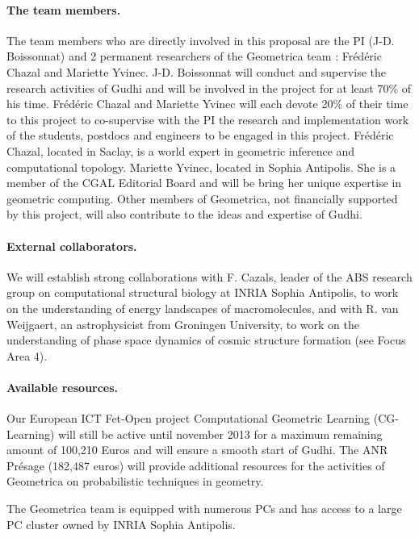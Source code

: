 \paragraph{The team members.}
The team members who are directly involved in this proposal are the PI (J-D. Boissonnat) and 2 permanent researchers of the Geometrica team : Fr\'ed\'eric Chazal and Mariette Yvinec.  J-D. Boissonnat will conduct and supervise the research activities of Gudhi and will be involved in the project for at least 70\% of his time.  Fr\'ed\'eric Chazal and Mariette Yvinec will each devote 20\% of their time to this project to co-supervise with the PI the research and implementation work of the students, postdocs and engineers to be engaged in this project. Fr\'ed\'eric Chazal, located in Saclay,  is a world expert in geometric inference and computational topology. Mariette Yvinec, located in Sophia Antipolis. She is a member of the CGAL Editorial Board and will be bring her unique expertise in geometric computing. Other members of Geometrica, not financially supported by this project, will also contribute to the ideas and expertise of Gudhi.

\paragraph{External collaborators.} We will establish  strong collaborations with F. Cazals, leader of the ABS research group on computational structural biology at INRIA Sophia Antipolis, to work on the understanding of energy landscapes of macromolecules,  and with R. van Weijgaert, an astrophysicist from Groningen University, to work on the understanding of phase space dynamics of cosmic structure formation (see Focus Area 4).

\paragraph{Available resources.} Our European ICT Fet-Open project Computational Geometric Learning (CG-Learning) will still be active until november 2013 for a maximum remaining amount of 100,210 Euros and will ensure a smooth start of Gudhi.  The ANR Pr\'esage (182,487 euros) will provide additional resources for the activities of Geometrica on probabilistic techniques in geometry.

The Geometrica team is equipped with numerous PCs and has access to a large PC cluster owned by INRIA Sophia Antipolis.

